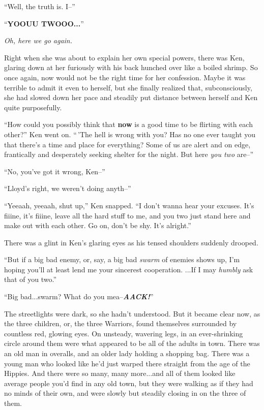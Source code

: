 \documentclass[
]{article}
\begin{document}
``Well, the truth is. I--''

``\textbf{YOOUU TWOOO...}''

\emph{Oh, here we go again.}

Right when she was about to explain her own special powers, there was
Ken, glaring down at her furiously with his back hunched over like a
boiled shrimp. So once again, now would not be the right time for her
confession. Maybe it was terrible to admit it even to herself, but she
finally realized that, subconsciously, she had slowed down her pace and
steadily put distance between herself and Ken quite purposefully.

``How could you possibly think that \textbf{now} is a good time to be
flirting with each other?'' Ken went on. ``\,'The hell is wrong with
you? Has no one ever taught you that there's a time and place for
everything? Some of us are alert and on edge, frantically and
desperately seeking shelter for the night. But here \emph{you two}
are--''

``No, you've got it wrong, Ken--''

``Lloyd's right, we weren't doing anyth--''

``Yeeaah, yeeaah, shut up,'' Ken snapped. ``I don't wanna hear your
excuses. It's fiiine, it's fiiine, leave all the hard stuff to me, and
you two just stand here and make out with each other. Go on, don't be
shy. It's alright.''

There was a glint in Ken's glaring eyes as his tensed shoulders suddenly
drooped.

``But if a big bad enemy, or, say, a big bad \emph{swarm} of enemies
shows up, I'm hoping you'll at least lend me your sincerest cooperation.
...If I may \emph{humbly} ask that of you two.''

``Big bad...swarm? What do you mea--\emph{\textbf{AACK!}}''

The streetlights were dark, so she hadn't understood. But it became
clear now, as the three children, or, the three Warriors, found
themselves surrounded by countless red, glowing eyes. On unsteady,
wavering legs, in an ever-shrinking circle around them were what
appeared to be all of the adults in town. There was an old man in
overalls, and an older lady holding a shopping bag. There was a young
man who looked like he'd just warped there straight from the age of the
Hippies. And there were so many, many more...and all of them looked like
average people you'd find in any old town, but they were walking as if
they had no minds of their own, and were slowly but steadily closing in
on the three of them.
\end{document}
